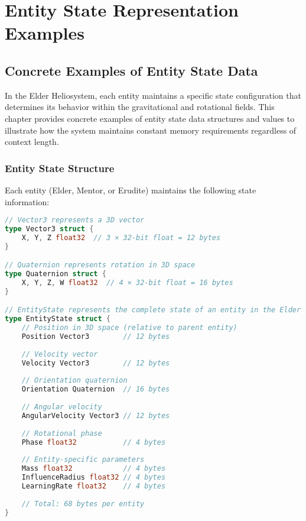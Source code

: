 \chapter{Entity State Representation Examples}

\section{Concrete Examples of Entity State Data}

In the Elder Heliosystem, each entity maintains a specific state configuration that determines its behavior within the gravitational and rotational fields. This chapter provides concrete examples of entity state data structures and values to illustrate how the system maintains constant memory requirements regardless of context length.

\subsection{Entity State Structure}

Each entity (Elder, Mentor, or Erudite) maintains the following state information:

\begin{lstlisting}[language=Go, caption=Entity State Data Structure in Go]
// Vector3 represents a 3D vector
type Vector3 struct {
    X, Y, Z float32  // 3 × 32-bit float = 12 bytes
}

// Quaternion represents rotation in 3D space
type Quaternion struct {
    X, Y, Z, W float32  // 4 × 32-bit float = 16 bytes
}

// EntityState represents the complete state of an entity in the Elder system
type EntityState struct {
    // Position in 3D space (relative to parent entity)
    Position Vector3        // 12 bytes
    
    // Velocity vector
    Velocity Vector3        // 12 bytes
    
    // Orientation quaternion
    Orientation Quaternion  // 16 bytes
    
    // Angular velocity
    AngularVelocity Vector3 // 12 bytes
    
    // Rotational phase
    Phase float32           // 4 bytes
    
    // Entity-specific parameters
    Mass float32            // 4 bytes
    InfluenceRadius float32 // 4 bytes
    LearningRate float32    // 4 bytes
    
    // Total: 68 bytes per entity
}
\end{lstlisting}

